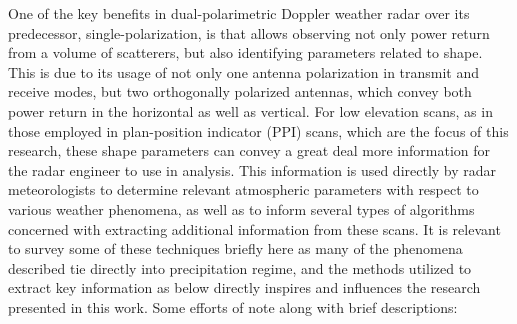 One of the key benefits \cite{doviak2000considerations} in dual-polarimetric Doppler weather radar over its predecessor, single-polarization, is that allows observing not only power return from a volume of scatterers, but also identifying parameters related to shape.
This is due to its usage of not only one antenna polarization in transmit and receive modes, but two orthogonally polarized antennas, which convey both power return in the horizontal as well as vertical.
For low elevation scans, as in those employed in plan-position indicator (PPI) scans, which are the focus of this research, these shape parameters can convey a great deal more information for the radar engineer to use in analysis.
This information is used directly by radar meteorologists to determine relevant atmospheric parameters with respect to various weather phenomena, as well as to inform several types of algorithms concerned with extracting additional information from these scans.
It is relevant to survey some of these techniques briefly here as many of the phenomena described tie directly into precipitation regime, and the methods utilized to extract key information as below directly inspires and influences the research presented in this work.
Some efforts of note along with brief descriptions:

